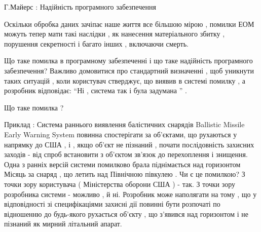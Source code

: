 \documentclass[oneside,final,14pt]{extreport}
\begin{document}
Г.Майерс : Надійність програмного забезпечення

Оскільки обробка даних зачіпає наше життя все більшою мірою , помилки ЕОМ можуть тепер мати такі наслідки , як нанесення матеріального збитку , порушення секретності і багато інших , включаючи смерть.

Що таке помилка в програмному забезпеченні і що таке надійність програмного забезпечення? Важливо домовитися про стандартний визначенні , щоб уникнути таких ситуацій , коли користувач стверджує, що виявив в системі помилку , а розробник відповідає: ``Ні , система так і була задумана '' .

Що таке помилка ?

Приклад : Система раннього виявлення балістичних снарядів Ballistic Missile Early Warning System повинна спостерігати за об'єктами, що рухаються у напрямку до США , і , якщо об'єкт не пізнаний , почати послідовність захисних заходів - від спроб встановити з об'єктом зв'язок до перехоплення і знищення. Одна з ранніх версій системи помилково брала піднімається над горизонтом Місяць за снаряд , що летить над Північною півкулею . Чи є це помилкою? З точки зору користувача ( Міністерства оборони США ) - так. З точки зору розробника системи - можливо , й ні. Розробник може наполягати на тому , що у відповідності зі специфікаціями захисні дії повинні бути розпочаті по відношенню до будь-якого рухається об'єкту , що з'явився над горизонтом і не пізнаний як мирний літальний апарат.
\end{document}

